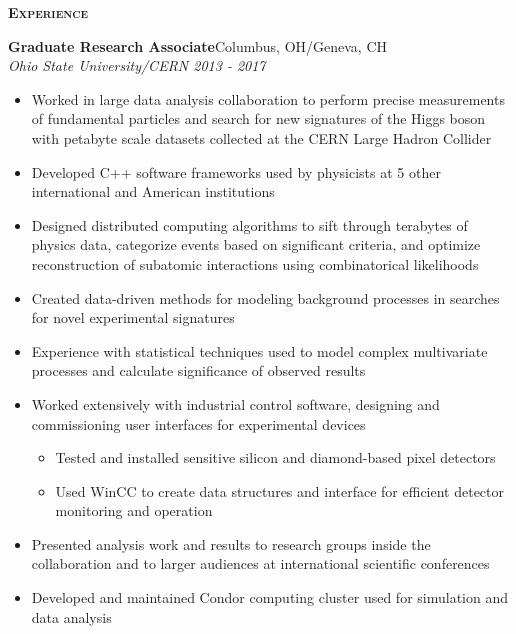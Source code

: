 \documentclass[line]{letter}
\begin{document}
{\vspace{5pt} \Large \textsc{\textbf{Experience}}}
\begin{addmargin}[1em]{1em}
{\large {\bf Graduate Research Associate}\hfill Columbus, OH/Geneva, CH\vspace{1mm}}\\
{\large \it Ohio State University/CERN \hfill  2013 - 2017} \\
\vspace{-6mm}
\begin{itemize}[leftmargin=5mm]
\item Worked in large data analysis collaboration to perform precise measurements of fundamental particles and search for new signatures of the Higgs boson with petabyte scale datasets collected at the CERN Large Hadron Collider
\item Developed C++ software frameworks used by physicists at 5 other international and American institutions
\item Designed distributed computing algorithms to sift through terabytes of physics data, categorize events based on significant criteria, and optimize reconstruction of subatomic interactions using combinatorical likelihoods 
\item Created data-driven methods for modeling background processes in searches for novel experimental signatures 
\item Experience with statistical techniques used to model complex multivariate processes and calculate significance of observed results
\item Worked extensively with industrial control software, designing and commissioning user interfaces for experimental devices
\begin{itemize}
\item Tested and installed sensitive silicon and diamond-based pixel detectors
\item Used WinCC to create data structures and interface for efficient detector monitoring and operation
\end{itemize}\vspace{2mm}
\item Presented analysis work and results to research groups inside the collaboration and to larger audiences at international scientific conferences\vspace{2mm}
\item Developed and maintained Condor computing cluster used for simulation and data analysis
\end{itemize}
\vspace{1mm}


\end{addmargin}
\end{document}
